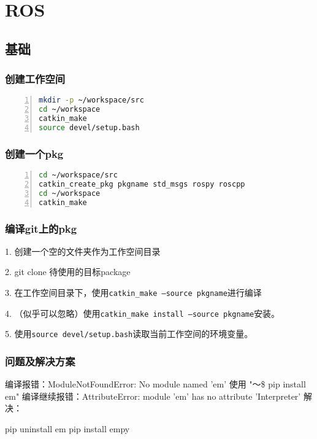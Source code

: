 \chapter{ROS}
\section{基础}
\subsection{创建工作空间}
\begin{lstlisting}[language=bash,numbers=left,firstnumber = 1,numberstyle=\tiny,breaklines = true,keywordstyle=\color{blue!70},commentstyle=\color{red!50!green!50!blue!50},frame=shadowbox, rulesepcolor=\color{red!20!green!20!blue!20}]
mkdir -p ~/workspace/src
cd ~/workspace
catkin_make
source devel/setup.bash
\end{lstlisting}

\subsection{创建一个pkg}
\begin{lstlisting}[language=bash,numbers=left,firstnumber = 1,numberstyle=\tiny,breaklines = true,keywordstyle=\color{blue!70},commentstyle=\color{red!50!green!50!blue!50},frame=shadowbox, rulesepcolor=\color{red!20!green!20!blue!20}]
cd ~/workspace/src
catkin_create_pkg pkgname std_msgs rospy roscpp
cd ~/workspace
catkin_make
\end{lstlisting}







\subsection{编译git上的pkg}
1. 创建一个空的文件夹作为工作空间目录

2. git clone 待使用的目标package

3. 在工作空间目录下，使用\texttt{catkin_make --source pkgname}进行编译

4. （似乎可以忽略）使用\texttt{catkin_make install --source pkgname}安装。

5. 使用\texttt{source devel/setup.bash}读取当前工作空间的环境变量。




\subsection{问题及解决方案}
编译报错：ModuleNotFoundError: No module named 'em'
使用 "～\$ pip install em"
编译继续报错：AttributeError: module 'em' has no attribute 'Interpreter'
解决：

pip uninstall em
pip install empy